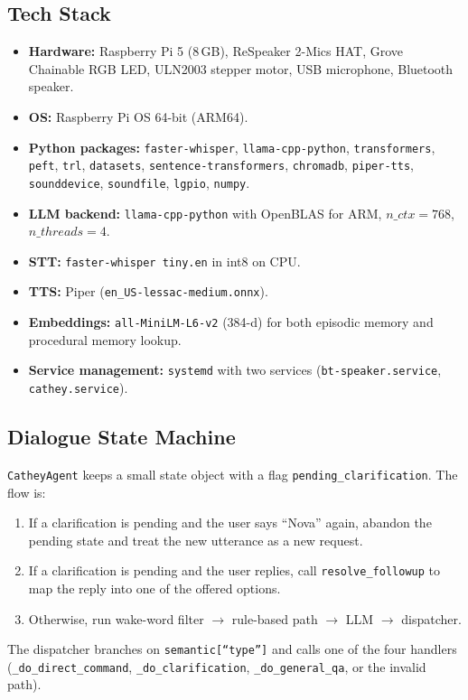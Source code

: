 \documentclass[conference]{IEEEtran}
\begin{document}
\subsection{Tech Stack}

\begin{itemize}
    \item \textbf{Hardware:} Raspberry Pi 5 (8\,GB), ReSpeaker 2-Mics HAT, Grove Chainable RGB LED, ULN2003 stepper motor, USB microphone, Bluetooth speaker.
    \item \textbf{OS:} Raspberry Pi OS 64-bit (ARM64).
    \item \textbf{Python packages:} \texttt{faster-whisper}, \texttt{llama-cpp-python}, \texttt{transformers}, \texttt{peft}, \texttt{trl}, \texttt{datasets}, \texttt{sentence-transformers}, \texttt{chromadb}, \texttt{piper-tts}, \texttt{sounddevice}, \texttt{soundfile}, \texttt{lgpio}, \texttt{numpy}.
    \item \textbf{LLM backend:} \texttt{llama-cpp-python} with OpenBLAS for ARM, $n\_ctx{=}768$, $n\_threads{=}4$.
    \item \textbf{STT:} \texttt{faster-whisper tiny.en} in int8 on CPU.
    \item \textbf{TTS:} Piper (\texttt{en\_US-lessac-medium.onnx}).
    \item \textbf{Embeddings:} \texttt{all-MiniLM-L6-v2} (384-d) for both episodic memory and procedural memory lookup.
    \item \textbf{Service management:} \texttt{systemd} with two services (\texttt{bt-speaker.service}, \texttt{cathey.service}).
\end{itemize}

\subsection{Dialogue State Machine}

\texttt{CatheyAgent} keeps a small state object with a flag \texttt{pending\_clarification}. The flow is:
\begin{enumerate}
    \item If a clarification is pending and the user says ``Nova'' again, abandon the pending state and treat the new utterance as a new request.
    \item If a clarification is pending and the user replies, call \texttt{resolve\_followup} to map the reply into one of the offered options.
    \item Otherwise, run wake-word filter $\rightarrow$ rule-based path $\rightarrow$ LLM $\rightarrow$ dispatcher.
\end{enumerate}
The dispatcher branches on \texttt{semantic[``type'']} and calls one of the four handlers (\texttt{\_do\_direct\_command}, \texttt{\_do\_clarification}, \texttt{\_do\_general\_qa}, or the invalid path).
\end{document}
